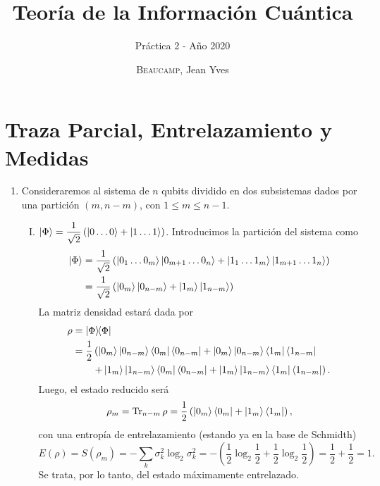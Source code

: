 \documentclass{scrartcl}
\title{Teoría de la Información Cuántica}
\subtitle{Práctica 2 - Año 2020}
\author{\textsc{Beaucamp}, Jean Yves}
\date{}
\newcommand{\inv}[1]{\frac{1}{#1}}
\DeclareRobustCommand{\[}{\begin{equation}}
\DeclareRobustCommand{\]}{\end{equation}}
\begin{document}
\maketitle

\section{Traza Parcial, Entrelazamiento y Medidas}
\begin{enumerate}
    
    \item Consideraremos al sistema de $n$ qubits dividido en dos subsistemas dados por una partición $(m, n - m)$, con $1 \leq m \leq n -1$.
    \begin{enumerate}[(I)]
        \item $\displaystyle \ket{\Phi} = \inv{\sqrt{2}} \left( \ket{0 \dots 0} + \ket{1 \dots 1} \right)$. Introducimos la partición del sistema como
        \begin{align}
            \ket{\Phi} &= \inv{\sqrt{2}} \left( \ket{0_1 \dots 0_m} \ket{0_{m + 1} \dots 0_n} + \ket{1_1 \dots 1_m} \ket{1_{m + 1} \dots 1_n} \right) \\
            &= \inv{\sqrt{2}} \left( \ket{0_m} \ket{0_{n - m}} + \ket{1_m} \ket{1_{n-m}} \right)
        \end{align}
        La matriz densidad estará dada por
        \begin{align}
            \rho &= \dyad{\Phi}{\Phi} \\
                &= \inv{2} \left( \ket{0_m} \ket{0_{n - m}} \bra{0_m} \bra{0_{n - m}} + \ket{0_m} \ket{0_{n - m}} \bra{1_m} \bra{1_{n - m}} \right. \\
                &\quad \quad \left. + \ket{1_m} \ket{1_{n - m}} \bra{0_m} \bra{0_{n - m}} + \ket{1_m} \ket{1_{n - m}} \bra{1_m} \bra{1_{n - m}} \right).
        \end{align}
        Luego, el estado reducido será
        \[ \rho_m = \Tr_{n-m} \rho = \inv{2} \left( \ket{0_m} \bra{0_m} + \ket{1_m} \bra{1_m} \right), \]
        con una entropía de entrelazamiento (estando ya en la base de Schmidth)
        \[ E(\rho) = S(\rho_m) = -\sum_k \sigma_k^2 \log_2 \sigma_k^2 = - \left( \inv{2} \log_2 \inv{2} + \inv{2} \log_2 \inv{2} \right) = \inv{2} + \inv{2} = 1. \]
        Se trata, por lo tanto, del estado máximamente entrelazado.
        

\end{enumerate}
\end{enumerate}
\end{document}
